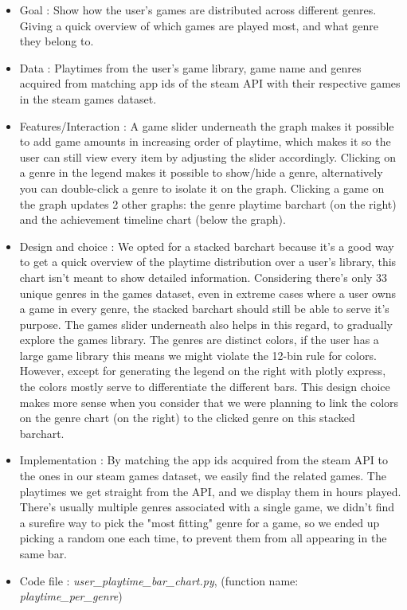 \documentclass{article}
\begin{document}
        \begin{itemize}
           \item Goal : Show how the user's games are distributed across different genres. Giving a quick overview of which games are played most, and what genre they belong to.
           \item Data : Playtimes from the user's game library, game name and genres acquired from matching app ids of the steam API with their respective games in the steam games dataset.
           \item Features/Interaction : A game slider underneath the graph makes it possible to add game amounts in increasing order of playtime, which makes it so the user can still view every item by adjusting the slider accordingly. Clicking on a genre in the legend makes it possible to show/hide a genre, alternatively you can double-click a genre to isolate it on the graph. Clicking a game on the graph updates 2 other graphs: the genre playtime barchart (on the right) and the achievement timeline chart (below the graph).
           \item Design and choice : We opted for a stacked barchart because it's a good way to get a quick overview of the playtime distribution over a user's library, this chart isn't meant to show detailed information. Considering there's only 33 unique genres in the games dataset, even in extreme cases where a user owns a game in every genre, the stacked barchart should still be able to serve it's purpose. The games slider underneath also helps in this regard, to gradually explore the games library. The genres are distinct colors, if the user has a large game library this means we might violate the 12-bin rule for colors. However, except for generating the legend on the right with plotly express, the colors mostly serve to differentiate the different bars. This design choice makes more sense when you consider that we were planning to link the colors on the genre chart (on the right) to the clicked genre on this stacked barchart. 
           \item Implementation : By matching the app ids acquired from the steam API to the ones in our steam games dataset, we easily find the related games. The playtimes we get straight from the API, and we display them in hours played. There's usually multiple genres associated with a single game, we didn't find a surefire way to pick the "most fitting" genre for a game, so we ended up picking a random one each time, to prevent them from all appearing in the same bar. 
           \item Code file : \textit{user\_playtime\_bar\_chart.py}, (function name: \textit{playtime\_per\_genre})
        \end{itemize}
        
\end{document}
